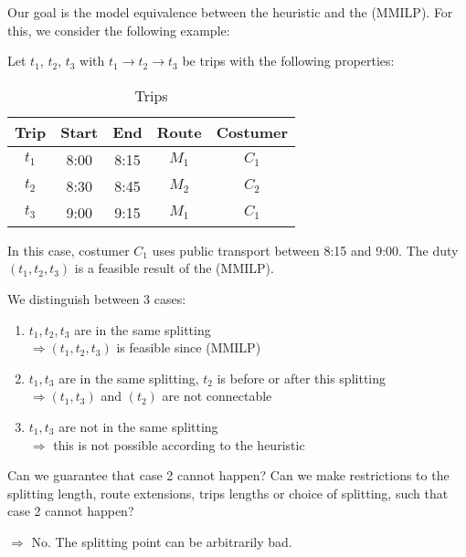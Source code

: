 Our goal is the model equivalence between the heuristic and the (MMILP). For this, we consider the following example:

\begin{example}

Let $t_1$, $t_2$, $t_3$ with $t_1\to t_2\to t_3$ be trips with the following properties: 

\begin{table}[ht]
	\centering
	\begin{tabular}{c|cccc}
		Trip & Start & End & Route & Costumer \\
		\hline
		$t_1$ & 8:00 & 8:15 & $M_1$ & $C_1$ \\
		$t_2$ & 8:30 & 8:45 & $M_2$ & $C_2$ \\
		$t_3$ & 9:00 & 9:15 & $M_1$ & $C_1$ \\
	\end{tabular}
	\caption{Trips}
\end{table}

In this case, costumer $C_1$ uses public transport between 8:15 and 9:00. The duty $\left(t_1,t_2,t_3\right)$ is a feasible result of the (MMILP).

\end{example}

We distinguish between 3 cases:

\begin{enumerate}
	\item{$t_1,t_2,t_3$ are in the same splitting \\
		$\Rightarrow \left(t_1,t_2,t_3\right)$ is feasible since (MMILP)}
	\item{$t_1,t_3$ are in the same splitting, $t_2$ is before or after this splitting \\
		$\Rightarrow \left(t_1,t_3\right)$ and $\left(t_2\right)$ are not connectable}
	\item{$t_1,t_3$ are not in the same splitting \\
		$\Rightarrow$ this is not possible according to the heuristic}
\end{enumerate}

\begin{question}

Can we guarantee that case 2 cannot happen? Can we make restrictions to the splitting length, route extensions, trips lengths or choice of splitting, such that case 2 cannot happen? 

$\Rightarrow$ No. The splitting point can be arbitrarily bad.

\end{question}

